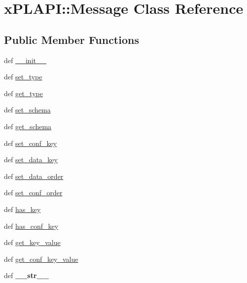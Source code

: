 \hypertarget{classxPLAPI_1_1Message}{
\section{xPLAPI::Message Class Reference}
\label{classxPLAPI_1_1Message}
}
\subsection*{Public Member Functions}
\begin{CompactItemize}
\item 
def \hyperlink{classxPLAPI_1_1Message_f1efb1186af373f1ce3d107be47e3f3f}{\_\-\_\-init\_\-\_\-}
\item 
def \hyperlink{classxPLAPI_1_1Message_a24b962cfffbd90f1cb79a2c20e581e6}{set\_\-type}
\item 
def \hyperlink{classxPLAPI_1_1Message_55aad8c9b685e349f7e3d3f58b6ff5aa}{get\_\-type}
\item 
def \hyperlink{classxPLAPI_1_1Message_560b2b7685ee99a34ea7d01e7135477c}{set\_\-schema}
\item 
def \hyperlink{classxPLAPI_1_1Message_58df48b064cb3d59780a51c67136e88a}{get\_\-schema}
\item 
def \hyperlink{classxPLAPI_1_1Message_014808e1035dcea973692d4d823427ce}{set\_\-conf\_\-key}
\item 
def \hyperlink{classxPLAPI_1_1Message_6bc039067bf79dd06b649e95870cfba9}{set\_\-data\_\-key}
\item 
def \hyperlink{classxPLAPI_1_1Message_254a763505a2ddb64ecd8d1b96f984d6}{set\_\-data\_\-order}
\item 
def \hyperlink{classxPLAPI_1_1Message_191e86e1dccd20aa0ea63158429e6d68}{set\_\-conf\_\-order}
\item 
def \hyperlink{classxPLAPI_1_1Message_e8bde03ac8436238c97cad324897c2ee}{has\_\-key}
\item 
def \hyperlink{classxPLAPI_1_1Message_8bc93e1bab48128e660be2d1e8ac7199}{has\_\-conf\_\-key}
\item 
def \hyperlink{classxPLAPI_1_1Message_80231e4e96a2247263ed3d2bb7f9cbf3}{get\_\-key\_\-value}
\item 
def \hyperlink{classxPLAPI_1_1Message_de17ca84597e627ae63f9b1cf5a4b284}{get\_\-conf\_\-key\_\-value}
\item 
\hypertarget{classxPLAPI_1_1Message_4d5b950513dedc31dfe0dcf51823c43d}{
def \textbf{\_\-\_\-str\_\-\_\-}}
\label{classxPLAPI_1_1Message_4d5b950513dedc31dfe0dcf51823c43d}

\end{CompactItemize}
